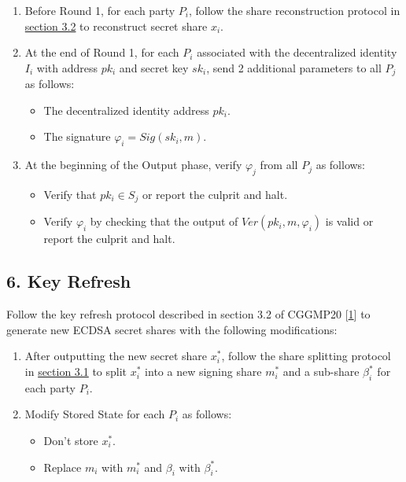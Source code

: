\documentclass[
]{article}
\providecommand{\tightlist}{%
  \setlength{\itemsep}{0pt}\setlength{\parskip}{0pt}}
\begin{document}
\begin{enumerate}
\def\labelenumi{\arabic{enumi}.}
\tightlist
\item
  Before Round 1, for each party \(P_i\), follow the share
  reconstruction protocol in
  \protect\hyperlink{share-reconstruction}{section 3.2} to reconstruct
  secret share \(x_i\).
\item
  At the end of Round 1, for each \(P_i\) associated with the
  decentralized identity \(I_i\) with address \(pk_i\) and secret key
  \(sk_i\), send 2 additional parameters to all \(P_j\) as follows:

  \begin{itemize}
  \tightlist
  \item
    The decentralized identity address \(pk_i\).
  \item
    The signature \(\varphi _i = Sig(sk_i, m)\).
  \end{itemize}
\item
  At the beginning of the Output phase, verify \(\varphi _j\) from all
  \(P_j\) as follows:

  \begin{itemize}
  \tightlist
  \item
    Verify that \(pk_i \in S_j\) or report the culprit and halt.
  \item
    Verify \(\varphi _i\) by checking that the output of
    \(Ver(pk_i, m, \varphi _i)\) is valid or report the culprit and
    halt.
  \end{itemize}
\end{enumerate}

\hypertarget{key-refresh}{%
\subsection{6. Key Refresh}\label{key-refresh}}

Follow the key refresh protocol described in section 3.2 of CGGMP20
{[}\protect\hyperlink{ref-cggmp20}{1}{]} to generate new ECDSA secret
shares with the following modifications:

\begin{enumerate}
\def\labelenumi{\arabic{enumi}.}
\tightlist
\item
  After outputting the new secret share \(x_i^\ast\), follow the share
  splitting protocol in \protect\hyperlink{share-splitting}{section 3.1}
  to split \(x_i^\ast\) into a new signing share \(m_i^\ast\) and a
  sub-share \(\beta _i^\ast\) for each party \(P_i\).
\item
  Modify Stored State for each \(P_i\) as follows:

  \begin{itemize}
  \tightlist
  \item
    Don't store \(x_i^\ast\).
  \item
    Replace \(m_i\) with \(m_i^\ast\) and \(\beta _i\) with
    \(\beta _i^\ast\).
  \end{itemize}
\end{enumerate}
\end{document}
